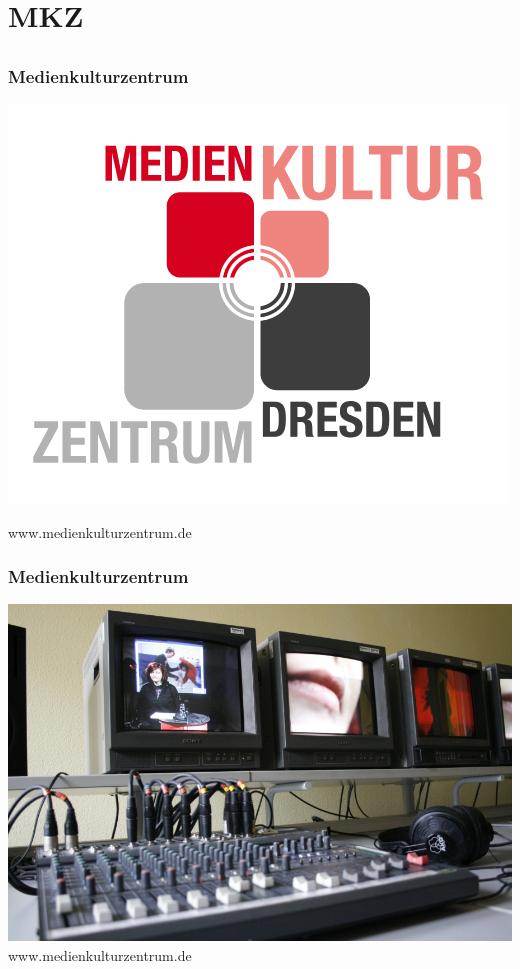 \documentclass[12pt]{beamer}
\newcommand{\license}[2][]{\\#2\ifthenelse{\equal{#1}{}}{}{\\\scriptsize\url{#1}}}
\begin{document}
\section{MKZ}
	\subsection{}

\begin{frame}
  \frametitle{Medienkulturzentrum}
  \begin{minipage}{\linewidth}
	\centering	
	\includegraphics[height=0.6\textheight]{img//logo_medienkulturzentrum.png}
	
	www.medienkulturzentrum.de
	\end{minipage}
  \end{frame}
  \begin{frame}
	\frametitle{Medienkulturzentrum}
	\begin{minipage}{\linewidth}
		\centering
		\includegraphics[height=0.7\textheight]{img//mkz-film.jpg}
		\tiny\license{www.medienkulturzentrum.de}
	\end{minipage}
  \end{frame}
\end{document}
